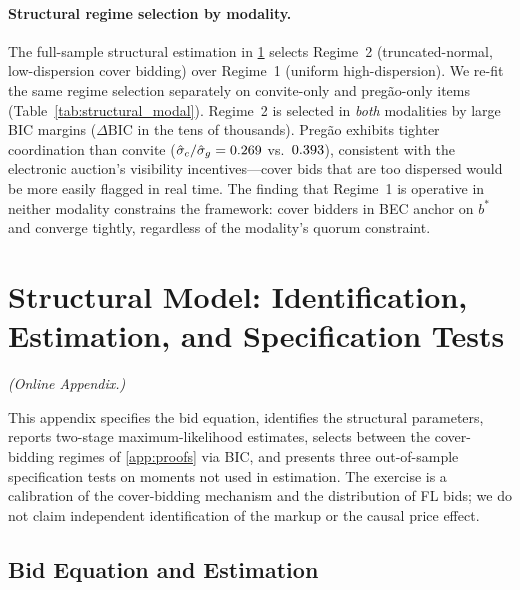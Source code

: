 

\paragraph{Structural regime selection by modality.}
The full-sample structural estimation in
\ref{app:structural_id} selects Regime~2 (truncated-normal,
low-dispersion cover bidding) over Regime~1 (uniform
high-dispersion). We re-fit the same regime selection
separately on convite-only and pregão-only items
(Table~\ref{tab:structural_modal}). Regime~2 is selected in
\emph{both} modalities by large BIC margins
($\Delta\mathrm{BIC}$ in the tens of thousands).
Pregão exhibits tighter coordination than convite
($\hat{\sigma}_c/\hat{\sigma}_g = 0.269$ vs.\
$0.393$), consistent with the electronic
auction's visibility incentives---cover bids that are too
dispersed would be more easily flagged in real time. The
finding that Regime~1 is operative in neither modality
constrains the framework: cover bidders in BEC anchor on
$b^*$ and converge tightly, regardless of the modality's
quorum constraint.




\section{Structural Model: Identification, Estimation, and Specification Tests}
\label{app:structural_id}
\noindent\textit{(Online Appendix.)}\medskip

This appendix specifies the bid equation, identifies the
structural parameters, reports two-stage maximum-likelihood
estimates, selects between the cover-bidding regimes of
\ref{app:proofs} via BIC, and presents three out-of-sample
specification tests on moments not used in estimation. The
exercise is a calibration of the cover-bidding mechanism and the
distribution of FL bids; we do not claim independent
identification of the markup or the causal price effect.

\subsection{Bid Equation and Estimation}

